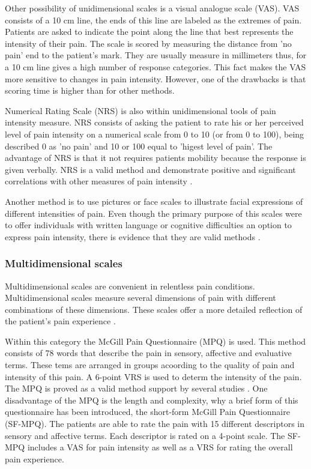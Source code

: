 Other possibility of unidimensional scales is a visual analogue scale (VAS). VAS consists of a 10 cm line, the ends of this line are labeled as the extremes of pain. Patients are asked to indicate the point along the line that best represents the intensity of their pain. The scale is scored by measuring the distance from 'no pain' end to the patient's mark. They are usually measure in millimeters thus, for a 10 cm line gives a high number of response categories. This fact makes the VAS more sensitive to changes in pain intensity. However, one of the drawbacks is that scoring time is higher than for other methods. 

Numerical Rating Scale (NRS) is also within unidimensional tools of pain intensity measure. NRS consists of asking the patient to rate his or her perceived level of pain intensity on a numerical scale from 0 to 10 (or from 0 to 100), being described 0 as 'no pain' and  10 or 100 equal to 'higest level of pain'. The advantage of NRS is that it not requires patients mobility because the response is given verbally. NRS is a valid method and demonstrate positive and significant correlations with other measures of pain intensity \cite{six methods paper}. 

Another method is to use pictures or face scales to illustrate facial expressions of different intensities of pain. Even though the primary purpose of this scales were to offer individuals with written language or cognitive difficulties an option to express pain intensity, there is evidence that they are valid methods \cite{libro pain}. 

\subsubsection{Multidimensional scales}
Multidimensional scales are convenient in relentless pain conditions. Multidimensional scales measure several dimensions of pain with different combinations of these dimensions. These scales offer a more detailed reflection of the patient's pain experience \cite{art and science}. 

Within this category the McGill Pain Questionnaire (MPQ) is used. This method consists of 78 words that describe the pain in sensory, affective and evaluative terms. These tems are arranged in groups acoording to the quality of pain and intensity of this pain. A 6-point VRS is used to determ the intensity of the pain. The MPQ is proved as a valid method support by several studies \cite{libro pain}.  One disadvantage of the MPQ is the length and complexity, why a brief form of this questionnaire has been introduced, the short-form McGill Pain Questionnaire (SF-MPQ). The patients are able to rate the pain with 15 different descriptors in sensory and affective terms. Each descriptor is rated on a 4-point scale. The SF-MPQ includes a VAS for pain intensity as well as a VRS for rating the overall pain experience. 

